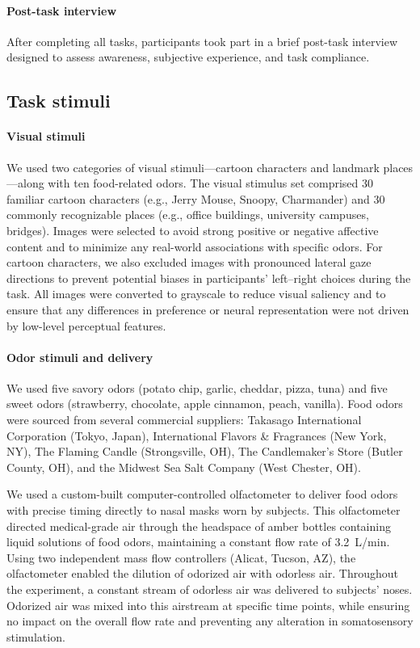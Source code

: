 \documentclass[12pt,letterpaper]{article}
\begin{document}
\paragraph*{Post-task interview}

After completing all tasks, participants took part in a brief post-task interview designed to assess awareness, subjective experience, and task compliance.


\subsection*{Task stimuli}

\paragraph*{Visual stimuli}

We used two categories of visual stimuli—cartoon characters and landmark places—along with ten food-related odors. The visual stimulus set comprised 30 familiar cartoon characters (e.g., Jerry Mouse, Snoopy, Charmander) and 30 commonly recognizable places (e.g., office buildings, university campuses, bridges). Images were selected to avoid strong positive or negative affective content and to minimize any real-world associations with specific odors. For cartoon characters, we also excluded images with pronounced lateral gaze directions to prevent potential biases in participants’ left–right choices during the task. All images were converted to grayscale to reduce visual saliency and to ensure that any differences in preference or neural representation were not driven by low-level perceptual features.

\paragraph*{Odor stimuli and delivery}

We used five savory odors (potato chip, garlic, cheddar, pizza, tuna) and five sweet odors (strawberry, chocolate, apple cinnamon, peach, vanilla). Food odors were sourced from several commercial suppliers: Takasago International Corporation (Tokyo, Japan), International Flavors \& Fragrances (New York, NY), The Flaming Candle (Strongsville, OH), The Candlemaker’s Store (Butler County, OH), and the Midwest Sea Salt Company (West Chester, OH).


We used a custom-built computer-controlled olfactometer to deliver food odors with precise timing directly to nasal masks worn by subjects. This olfactometer directed medical-grade air through the headspace of amber bottles containing liquid solutions of food odors, maintaining a constant flow rate of 3.2~L/min. Using two independent mass flow controllers (Alicat, Tucson, AZ), the olfactometer enabled the dilution of odorized air with odorless air. Throughout the experiment, a constant stream of odorless air was delivered to subjects’ noses. Odorized air was mixed into this airstream at specific time points, while ensuring no impact on the overall flow rate and preventing any alteration in somatosensory stimulation.
\end{document}
